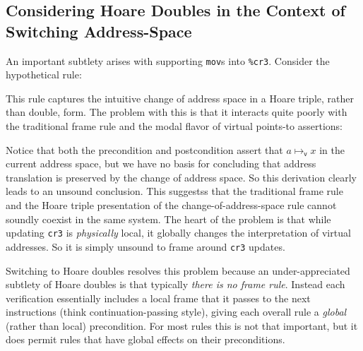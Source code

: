 \subsection{Considering Hoare Doubles in the Context of Switching Address-Space}
An important subtlety arises with supporting \lstinline|mov|s into \lstinline|%cr3|. Consider the hypothetical rule:
\begin{mathpar}
\end{mathpar}
This rule captures the intuitive change of address space in a Hoare triple, rather than double, form. The problem with this is that it interacts quite poorly with the traditional frame rule and the modal flavor of virtual points-to assertions:
\begin{mathpar}
\end{mathpar}
Notice that both the precondition and postcondition assert that $a\mapsto_\mathsf{v} x$ in the current address space, but we have no basis for concluding that address translation is preserved by the change of address space. So this derivation clearly leads to an unsound conclusion. This suggestss that the traditional frame rule and the Hoare triple presentation of the change-of-address-space rule cannot soundly coexist in the same system.
The heart of the problem is that while updating \lstinline|cr3| is \emph{physically} local, it globally changes the interpretation of virtual addresses. So it is simply unsound to frame around \lstinline|cr3| updates.

Switching to Hoare doubles resolves this problem because an under-appreciated subtlety of Hoare doubles is that typically \emph{there is no frame rule}. Instead each verification essentially includes a local frame that it passes to the next instructions (think continuation-passing style), giving each overall rule a \emph{global} (rather than local) precondition. For most rules this is not that important, but it does permit rules that have global effects on their preconditions.

